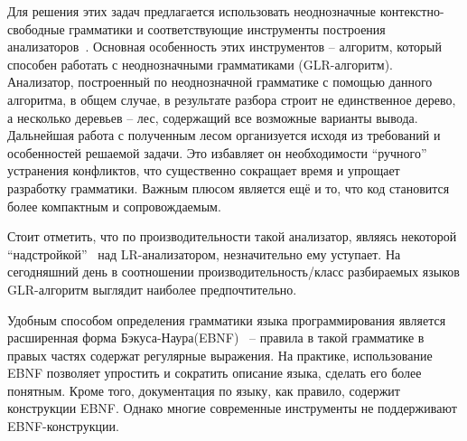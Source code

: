 Для решения этих задач предлагается использовать неоднозначные контекстно-свободные грамматики и соответствующие инструменты построения анализаторов~\cite{CurrentParsTechn}. Основная особенность этих инструментов -- алгоритм, который способен работать с неоднозначными грамматиками (GLR-алгоритм). Анализатор, построенный по неоднозначной  грамматике с помощью данного алгоритма, в общем случае, в результате разбора строит не единственное дерево, а несколько деревьев -- лес, содержащий все возможные варианты вывода. Дальнейшая работа с полученным лесом организуется исходя из требований и  особенностей решаемой задачи. Это избавляет он необходимости "`ручного"' устранения конфликтов, что существенно сокращает время и упрощает разработку грамматики. Важным плюсом является ещё и то, что код становится более компактным и сопровождаемым.
      



Стоит отметить, что по производительности такой анализатор, являясь некоторой "`надстройкой"' \ над LR-анализатором, незначительно ему уступает. На сегодняшний день в соотношении производительность/класс разбираемых языков GLR-алгоритм выглядит наиболее предпочтительно.

Удобным способом определения грамматики языка программирования является расширенная форма Бэкуса-Наура(EBNF)~\cite{ISOEBNF} -- правила в такой грамматике в правых частях содержат регулярные выражения. На практике, использование EBNF позволяет упростить и сократить описание языка, сделать его более понятным. Кроме того, документация по языку, как правило, содержит конструкции EBNF. Однако многие современные инструменты не поддерживают EBNF-конструкции.

